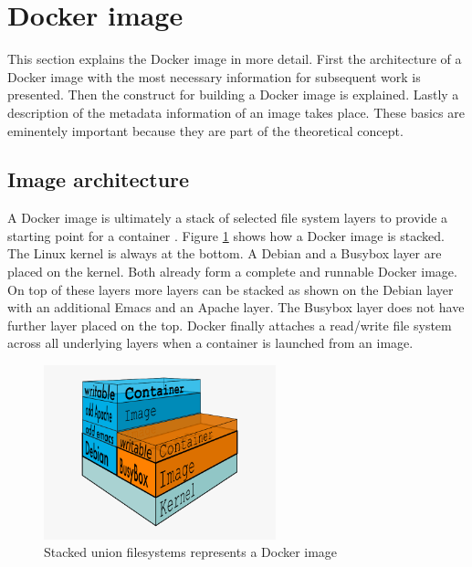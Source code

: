 \section{Docker image}
\label{sec:intro:docker_image:docker_img}
This section explains the Docker image in more detail. 
First the architecture of a Docker image with the most necessary information for subsequent work is presented. 
Then the construct for building a Docker image is explained. 
Lastly a description of the metadata information of an image takes place. 
These basics are eminentely important because they are part of the theoretical concept.

\subsection{Image architecture}
\label{sec:intro:docker_image:docker_img:architecture}
A Docker image is ultimately a stack of selected file system layers to provide a starting point for a container \cite{docker_images}.
Figure \ref{sec:intro:docker_image:docker_image_stack} shows how a Docker image is stacked. 
The Linux kernel is always at the bottom. A Debian and a Busybox layer are placed on the kernel.
Both already form a complete and runnable Docker image.
On top of these layers more layers can be stacked as shown on the Debian layer with an additional Emacs and an Apache layer. 
The Busybox layer does not have further layer placed on the top.
Docker finally attaches a read/write file system across all underlying layers when a container is launched from an image.
\begin{figure}[htbp]
 \centering
 \includegraphics[width=0.6\textwidth]{gfx/examples/docker-filesystems-busyboxrw}
 \caption{Stacked union filesystems represents a Docker image}
\label{sec:intro:docker_image:docker_image_stack}
\end{figure}

